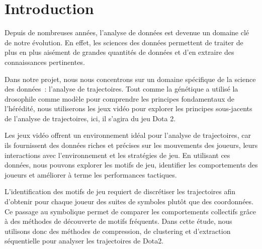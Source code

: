 \chapter{Introduction}


Depuis de nombreuses années, l'analyse de données est devenue un domaine clé de notre évolution. En effet, les sciences des données permettent de traiter de plus en plus aisément de grandes quantités de données et d'en extraire des connaissances pertinentes.

\bigskip

Dans notre projet, nous nous concentrons sur un domaine spécifique de la science des données~: l'analyse de trajectoires. Tout comme la génétique a utilisé la drosophile comme modèle pour comprendre les principes fondamentaux de l'hérédité, nous utiliserons les jeux vidéo pour explorer les principes sous-jacents de l'analyse de trajectoires, ici, il s'agira du jeu Dota 2.

\vspace{0.3cm}

Les jeux vidéo offrent un environnement idéal pour l'analyse de trajectoires, car ils fournissent des données riches et précises sur les mouvements des joueurs, leurs interactions avec l'environnement et les stratégies de jeu. En utilisant ces données, nous pouvons explorer les motifs de jeu, identifier les comportements des joueurs et améliorer à terme les performances tactiques. 

\vspace{0.3cm}

L'identification des motifs de jeu requiert de discrétiser les trajectoires afin d'obtenir pour chaque joueur des suites de symboles plutôt que des coordonnées. Ce passage au symbolique permet de comparer les comportements collectifs grâce à des méthodes de découverte de motifs fréquents. Dans cette étude, nous utilisons donc des méthodes de compression, de clustering et d'extraction séquentielle pour analyser les trajectoires de Dota2.

\vspace{0.3cm}


